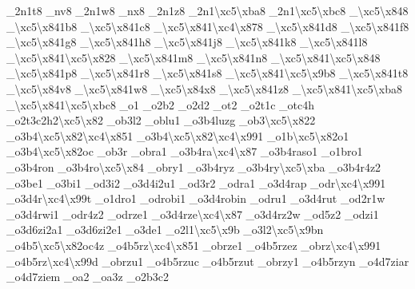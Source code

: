 \begin{DoxyCompactItemize}
\-\_\-2n1t8 \-\_\-nv8 \-\_\-2n1w8 \-\_\-nx8 \-\_\-2n1z8 \-\_\-2n1\textbackslash{}xc5\textbackslash{}xba8 \-\_\-2n1\textbackslash{}xc5\textbackslash{}xbc8 \-\_\-\textbackslash{}xc5\textbackslash{}x848 \-\_\textbackslash{}xc5\textbackslash{}x841b8 \-\_\textbackslash{}xc5\textbackslash{}x841c8 \-\_\textbackslash{}xc5\textbackslash{}x841\textbackslash{}xc4\textbackslash{}x878 \-\_\textbackslash{}xc5\textbackslash{}x841d8 \-\_\textbackslash{}xc5\textbackslash{}x841f8 \-\_\textbackslash{}xc5\textbackslash{}x841g8 \-\_\textbackslash{}xc5\textbackslash{}x841h8 \-\_\textbackslash{}xc5\textbackslash{}x841j8 \-\_\textbackslash{}xc5\textbackslash{}x841k8 \-\_\textbackslash{}xc5\textbackslash{}x841l8 \-\_\textbackslash{}xc5\textbackslash{}x841\textbackslash{}xc5\textbackslash{}x828 \-\_\textbackslash{}xc5\textbackslash{}x841m8 \-\_\textbackslash{}xc5\textbackslash{}x841n8 \-\_\textbackslash{}xc5\textbackslash{}x841\textbackslash{}xc5\textbackslash{}x848 \-\_\textbackslash{}xc5\textbackslash{}x841p8 \-\_\textbackslash{}xc5\textbackslash{}x841r8 \-\_\textbackslash{}xc5\textbackslash{}x841s8 \-\_\textbackslash{}xc5\textbackslash{}x841\textbackslash{}xc5\textbackslash{}x9b8 \-\_\textbackslash{}xc5\textbackslash{}x841t8 \-\_\-\textbackslash{}xc5\textbackslash{}x84v8 \-\_\textbackslash{}xc5\textbackslash{}x841w8 \-\_\-\textbackslash{}xc5\textbackslash{}x84x8 \-\_\textbackslash{}xc5\textbackslash{}x841z8 \-\_\textbackslash{}xc5\textbackslash{}x841\textbackslash{}xc5\textbackslash{}xba8 \-\_\textbackslash{}xc5\textbackslash{}x841\textbackslash{}xc5\textbackslash{}xbc8 \-\_\-o1 \-\_\-o2b2 \-\_\-o2d2 \-\_\-ot2 \-\_\-o2t1c \-\_\-otc4h \-\_\-o2t3c2h2\textbackslash{}xc5\textbackslash{}x82 \-\_\-ob3l2 \-\_\-oblu1 \-\_\-o3b4luzg \-\_\-ob3\textbackslash{}xc5\textbackslash{}x822 \-\_\-o3b4\textbackslash{}xc5\textbackslash{}x82\textbackslash{}xc4\textbackslash{}x851 \-\_\-o3b4\textbackslash{}xc5\textbackslash{}x82\textbackslash{}xc4\textbackslash{}x991 \-\_\-o1b\textbackslash{}xc5\textbackslash{}x82o1 \-\_\-o3b4\textbackslash{}xc5\textbackslash{}x82oc \-\_\-ob3r \-\_\-obra1 \-\_\-o3b4ra\textbackslash{}xc4\textbackslash{}x87 \-\_\-o3b4raso1 \-\_\-o1bro1 \-\_\-o3b4ron \-\_\-o3b4ro\textbackslash{}xc5\textbackslash{}x84 \-\_\-obry1 \-\_\-o3b4ryz \-\_\-o3b4ry\textbackslash{}xc5\textbackslash{}xba \-\_\-o3b4r4z2 \-\_\-o3be1 \-\_\-o3bi1 \-\_\-od3i2 \-\_\-o3d4i2u1 \-\_\-od3r2 \-\_\-odra1 \-\_\-o3d4rap \-\_\-odr\textbackslash{}xc4\textbackslash{}x991 \-\_\-o3d4r\textbackslash{}xc4\textbackslash{}x99t \-\_\-o1dro1 \-\_\-odrobi1 \-\_\-o3d4robin \-\_\-odru1 \-\_\-o3d4rut \-\_\-od2r1w \-\_\-o3d4rwi1 \-\_\-odr4z2 \-\_\-odrze1 \-\_\-o3d4rze\textbackslash{}xc4\textbackslash{}x87 \-\_\-o3d4rz2w \-\_\-od5z2 \-\_\-odzi1 \-\_\-o3d6zi2a1 \-\_\-o3d6zi2e1 \-\_\-o3de1 \-\_\-o2l1\textbackslash{}xc5\textbackslash{}x9b \-\_\-o3l2\textbackslash{}xc5\textbackslash{}x9bn \-\_\-o4b5\textbackslash{}xc5\textbackslash{}x82oc4z \-\_\-o4b5rz\textbackslash{}xc4\textbackslash{}x851 \-\_\-obrze1 \-\_\-o4b5rzez \-\_\-obrz\textbackslash{}xc4\textbackslash{}x991 \-\_\-o4b5rz\textbackslash{}xc4\textbackslash{}x99d \-\_\-obrzu1 \-\_\-o4b5rzuc \-\_\-o4b5rzut \-\_\-obrzy1 \-\_\-o4b5rzyn \-\_\-o4d7ziar \-\_\-o4d7ziem \-\_\-oa2 \-\_\-oa3z \-\_\-o2b3c2 
\end{DoxyCompactItemize}
